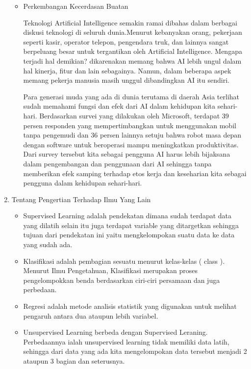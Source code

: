 \begin{enumerate}
\begin{itemize}
\item Perkembangan Kecerdasan Buatan
\par Teknologi Artificial Intelligence semakin ramai dibahas dalam berbagai diskusi teknologi di seluruh dunia.Menurut kebanyakan orang, pekerjaan seperti kasir, operator telepon, pengendara truk, dan lainnya sangat berpeluang besar untuk tergantikan oleh Artificial Intelligence. Mengapa terjadi hal demikian? dikarenakan memang bahwa AI lebih ungul dalam hal kinerja, fitur dan lain sebagainya. Namun, dalam beberapa aspek memang pekerja manusia masih unggul dibandingkan AI itu sendiri.
\par Para generasi muda yang ada di dunia terutama di daerah Asia terlihat sudah memahami fungsi dan efek dari AI dalam kehidupan kita sehari-hari. Berdasarkan survei yang dilakukan oleh Microsoft, terdapat 39 persen responden yang mempertimbangkan untuk menggunakan mobil tanpa pengemudi dan 36 persen lainnya setuju bahwa robot masa depan dengan software untuk beroperasi mampu meningkatkan produktivitas. Dari survey tersebut kita sebagai pengguna AI harus lebih bijaksana dalam pengembangan dan penggunaan dari AI sehingga tanpa memberikan efek samping terhadap etos kerja dan keseharian kita sebagai pengguna dalam kehidupan sehari-hari.
\end{itemize}
\item Tentang Pengertian Terhadap Ilmu Yang Lain
\begin{itemize}
\item Supervised Learning adalah pendekatan dimana sudah terdapat data yang dilatih selain itu juga terdapat variable yang ditargetkan sehingga tujuan dari pendekatan ini yaitu mengkelompokan suatu data ke data yang sudah ada.
\par
\item Klasifikasi adalah pembagian sesuatu menurut kelas-kelas ( class ). Menurut Ilmu Pengetahuan, Klasifikasi merupakan proses pengelompokkan benda berdasarkan ciri-ciri persamaan dan juga perbedaan.
\par
\item Regresi adalah metode analisis statistik yang digunakan untuk melihat pengaruh antara dua ataupun lebih variabel.
\par
\item Unsupervised Learning berbeda dengan Supervised Leraning. Perbedaannya ialah unsupervised learning tidak memiliki data latih, sehingga dari data yang ada kita mengelompokan data tersebut menjadi 2  ataupun 3 bagian dan seterusnya.
\par

\end{itemize}
\end{enumerate}
